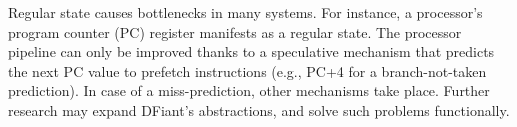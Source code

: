 Regular state causes bottlenecks in many systems. For instance, a processor's program counter (PC) register manifests as a regular state. The processor pipeline can only be improved thanks to a speculative mechanism that predicts the next PC value to prefetch instructions (e.g., PC+4 for a branch-not-taken prediction). In case of a miss-prediction, other mechanisms take place. Further research may expand DFiant's abstractions, and solve such problems functionally.



